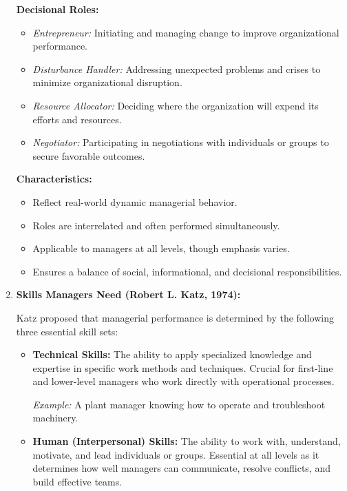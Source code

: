 \documentclass[10pt,a4paper]{book}
\begin{document}
\begin{enumerate}
    \textbf{Decisional Roles:}
    \begin{itemize}
        \item \textit{Entrepreneur:} Initiating and managing change to improve organizational performance.
        \item \textit{Disturbance Handler:} Addressing unexpected problems and crises to minimize organizational disruption.
        \item \textit{Resource Allocator:} Deciding where the organization will expend its efforts and resources.
        \item \textit{Negotiator:} Participating in negotiations with individuals or groups to secure favorable outcomes.
    \end{itemize}

    \textbf{Characteristics:}
    \begin{itemize}
        \item Reflect real-world dynamic managerial behavior.
        \item Roles are interrelated and often performed simultaneously.
        \item Applicable to managers at all levels, though emphasis varies.
        \item Ensures a balance of social, informational, and decisional responsibilities.
    \end{itemize}

    \item \textbf{Skills Managers Need (Robert L. Katz, 1974):}

    Katz proposed that managerial performance is determined by the following three essential skill sets:

    \begin{itemize}
        \item \textbf{Technical Skills:} 
        The ability to apply specialized knowledge and expertise in specific work methods and techniques. Crucial for first-line and lower-level managers who work directly with operational processes.

        \textit{Example:} A plant manager knowing how to operate and troubleshoot machinery.

        \item \textbf{Human (Interpersonal) Skills:}
        The ability to work with, understand, motivate, and lead individuals or groups. Essential at all levels as it determines how well managers can communicate, resolve conflicts, and build effective teams.


\end{itemize}
\end{enumerate}
\end{document}
